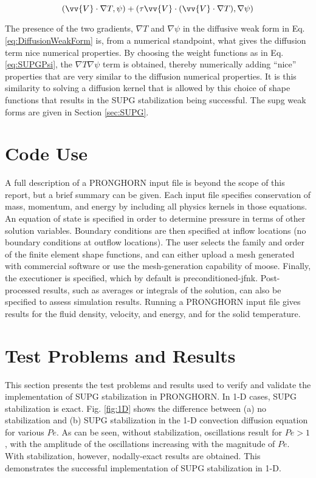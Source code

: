 \documentclass[10pt]{article}
\numberwithin{equation}{section} %
\begin{document}
\begin{equation}
\label{eq:AdvectiveWeakForm2}
(\vv{V}\cdot\nabla T,\psi)+(\tau\vv{V}\cdot(\vv{V}\cdot\nabla T),\nabla\psi)
\end{equation}

The presence of the two gradients, \(\nabla T\) and \(\nabla\psi\) in the diffusive weak form in Eq. \eqref{eq:DiffusionWeakForm} is, from a numerical standpoint, what gives the diffusion term nice numerical properties. By choosing the weight functions as in Eq. \eqref{eq:SUPGPsi}, the \(\nabla T\nabla\psi\) term is obtained, thereby numerically adding ``nice'' properties that are very similar to the diffusion numerical properties. It is this similarity to solving a diffusion kernel that is allowed by this choice of shape functions that results in the SUPG stabilization being successful. The \gls{supg} weak forms are given in Section \ref{sec:SUPG}.

\section{Code Use}

A full description of a PRONGHORN input file is beyond the scope of this report, but a brief summary can be given. Each input file specifies conservation of mass, momentum, and energy by including all physics kernels in those equations. An equation of state is specified in order to determine pressure in terms of other solution variables. Boundary conditions are then specified at inflow locations (no boundary conditions at outflow locations). The user selects the family and order of the finite element shape functions, and can either upload a mesh generated with commercial software or use the mesh-generation capability of \gls{moose}. Finally, the executioner is specified, which by default is preconditioned-\gls{jfnk}. Post-processed results, such as averages or integrals of the solution, can also be specified to assess simulation results. Running a PRONGHORN input file gives results for the fluid density, velocity, and energy, and for the solid temperature. 

\section{Test Problems and Results}

This section presents the test problems and results used to verify and validate the implementation of SUPG stabilization in PRONGHORN. In 1-D cases, SUPG stabilization is exact. Fig. \ref{fig:1D} shows the difference between (a) no stabilization and (b) SUPG stabilization in the 1-D convection diffusion equation for various \(Pe\). As can be seen, without stabilization, oscillations result for \(Pe>1\), with the amplitude of the oscillations increasing with the magnitude of \(Pe\). With stabilization, however, nodally-exact results are obtained. This demonstrates the successful implementation of SUPG stabilization in 1-D. 
\end{document}
